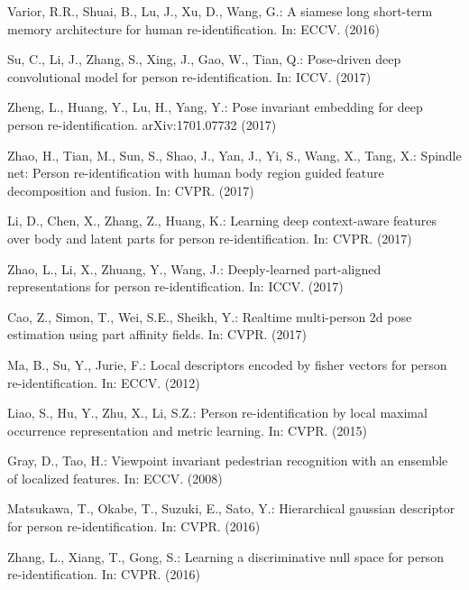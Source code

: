 \documentclass{llncs}
\begin{document}
\begin{thebibliography}{10}
Varior, R.R., Shuai, B., Lu, J., Xu, D., Wang, G.:
\newblock A siamese long short-term memory architecture for human
  re-identification.
\newblock In: ECCV. (2016)

Su, C., Li, J., Zhang, S., Xing, J., Gao, W., Tian, Q.:
\newblock Pose-driven deep convolutional model for person re-identification.
\newblock In: ICCV. (2017)

Zheng, L., Huang, Y., Lu, H., Yang, Y.:
\newblock Pose invariant embedding for deep person re-identification.
\newblock arXiv:1701.07732 (2017)

Zhao, H., Tian, M., Sun, S., Shao, J., Yan, J., Yi, S., Wang, X., Tang, X.:
\newblock Spindle net: Person re-identification with human body region guided
  feature decomposition and fusion.
\newblock In: CVPR. (2017)

Li, D., Chen, X., Zhang, Z., Huang, K.:
\newblock Learning deep context-aware features over body and latent parts for
  person re-identification.
\newblock In: CVPR. (2017)

Zhao, L., Li, X., Zhuang, Y., Wang, J.:
\newblock Deeply-learned part-aligned representations for person
  re-identification.
\newblock In: ICCV. (2017)

Cao, Z., Simon, T., Wei, S.E., Sheikh, Y.:
\newblock Realtime multi-person 2d pose estimation using part affinity fields.
\newblock In: CVPR. (2017)

Ma, B., Su, Y., Jurie, F.:
\newblock Local descriptors encoded by fisher vectors for person
  re-identification.
\newblock In: ECCV. (2012)

Liao, S., Hu, Y., Zhu, X., Li, S.Z.:
\newblock Person re-identification by local maximal occurrence representation
  and metric learning.
\newblock In: CVPR. (2015)

Gray, D., Tao, H.:
\newblock Viewpoint invariant pedestrian recognition with an ensemble of
  localized features.
\newblock In: ECCV. (2008)

Matsukawa, T., Okabe, T., Suzuki, E., Sato, Y.:
\newblock Hierarchical gaussian descriptor for person re-identification.
\newblock In: CVPR. (2016)

Zhang, L., Xiang, T., Gong, S.:
\newblock Learning a discriminative null space for person re-identification.
\newblock In: CVPR. (2016)


\end{thebibliography}
\end{document}
